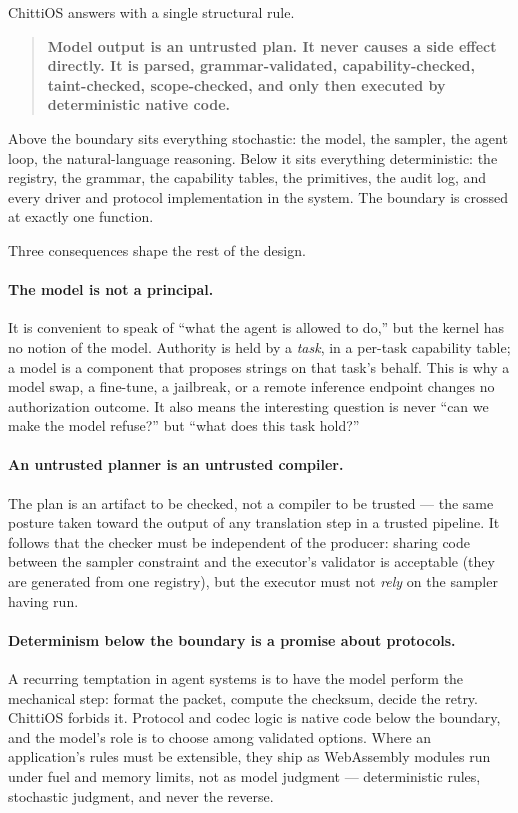 \documentclass[11pt]{article}
\newcommand{\os}{ChittiOS}
\begin{document}
\os{} answers with a single structural rule.

\begin{quote}
\textbf{Model output is an untrusted plan. It never causes a side effect
directly. It is parsed, grammar-validated, capability-checked, taint-checked,
scope-checked, and only then executed by deterministic native code.}
\end{quote}

Above the boundary sits everything stochastic: the model, the sampler, the
agent loop, the natural-language reasoning. Below it sits everything
deterministic: the registry, the grammar, the capability tables, the
primitives, the audit log, and every driver and protocol implementation in the
system. The boundary is crossed at exactly one function.

Three consequences shape the rest of the design.

\paragraph{The model is not a principal.} It is convenient to speak of
``what the agent is allowed to do,'' but the kernel has no notion of the
model. Authority is held by a \emph{task}, in a per-task capability table; a
model is a component that proposes strings on that task's behalf. This is why
a model swap, a fine-tune, a jailbreak, or a remote inference endpoint changes
no authorization outcome. It also means the interesting question is never
``can we make the model refuse?'' but ``what does this task hold?''

\paragraph{An untrusted planner is an untrusted compiler.} The plan is an
artifact to be checked, not a compiler to be trusted --- the same posture
taken toward the output of any translation step in a trusted pipeline. It
follows that the checker must be independent of the producer: sharing code
between the sampler constraint and the executor's validator is acceptable
(they are generated from one registry), but the executor must not \emph{rely}
on the sampler having run.

\paragraph{Determinism below the boundary is a promise about protocols.} A
recurring temptation in agent systems is to have the model perform the
mechanical step: format the packet, compute the checksum, decide the retry.
\os{} forbids it. Protocol and codec logic is native code below the boundary,
and the model's role is to choose among validated options. Where an
application's rules must be extensible, they ship as WebAssembly modules run
under fuel and memory limits, not as model judgment --- deterministic rules,
stochastic judgment, and never the reverse.
\end{document}
